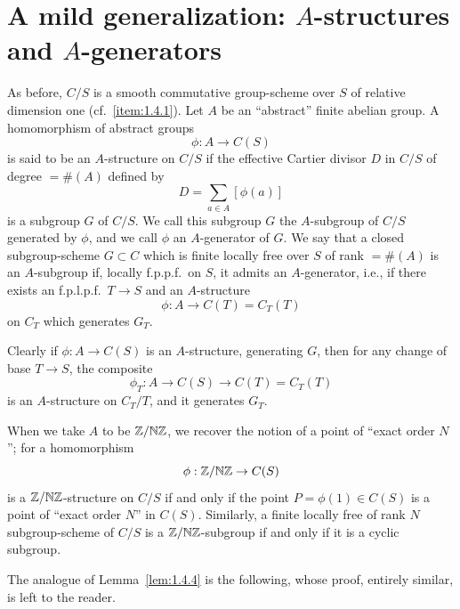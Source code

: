 \section{A mild generalization: $A$-structures and $A$-generators}
\label{sec:1.5}

\kmitem\label{item:1.5.1}
As before, $C/S$ is a smooth commutative group-scheme over $S$ of relative dimension one (cf.~\ref{item:1.4.1}). Let $A$ be an ``abstract'' finite abelian group. A homomorphism of abstract groups
\begin{equation}\label{eq:1.5.1.1}
\phi : A \to C(S)
\end{equation}
is said to be an $A$-structure on $C/S$ if the effective Cartier divisor $D$ in $C/S$ of degree $= \#(A)$ defined by
\[
D = \sum_{a \in A} [\phi(a)]
\]
is a subgroup $G$ of $C/S$. We call this subgroup $G$ the $A$-subgroup of $C/S$ generated by $\phi$, and we call $\phi$ an $A$-generator of $G$. We say that a closed subgroup-scheme $G \subset C$ which is finite locally free over $S$ of rank $= \#(A)$ is an $A$-subgroup if, locally f.p.p.f.\ on $S$, it admits an $A$-generator, i.e., if there exists an f.p.l.p.f.\ $T \to S$ and an $A$-structure
\[
\phi : A \to C(T) = C_T(T)
\]
on $C_T$ which generates $G_T$.

Clearly if $\phi : A \to C(S)$ is an $A$-structure, generating $G$, then for any change of base $T \to S$, the composite
\[
\phi_T : A \to C(S) \to C(T) = C_T(T)
\]
is an $A$-structure on $C_T/T$, and it generates $G_T$.

\kmitem\label{item:1.5.2}
When we take $A$ to be $\mathbb{Z}/\mathbb{N}\mathbb{Z}$, we recover the notion of a point of ``exact order $N$''; for a homomorphism
\[
\phi : \mathbb{Z}/\mathbb{N}\mathbb{Z} \to C(S)
\]
is a $\mathbb{Z}/\mathbb{N}\mathbb{Z}$-structure on $C/S$ if and only if the point $P = \phi(1) \in C(S)$ is a point of ``exact order $N$'' in $C(S)$. Similarly, a finite locally free of rank $N$ subgroup-scheme of $C/S$ is a $\mathbb{Z}/\mathbb{N}\mathbb{Z}$-subgroup if and only if it is a cyclic subgroup.

The analogue of Lemma~\ref{lem:1.4.4} is the following, whose proof, entirely similar, is left to the reader.

